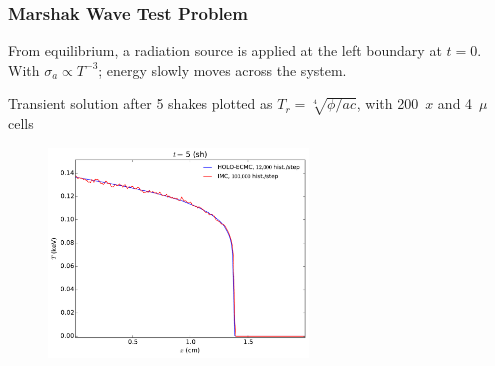 \documentclass[xcolor=dvipsnames,hyperref={pdfpagelabels=false},unknownkeysallowed]{beamer}
\newlength{\wideitemsep}
\let\olditem\item
\renewcommand{\item}{\setlength{\itemsep}{\wideitemsep}\olditem}
\begin{document}
{
\begin{frame}
    \frametitle{Marshak Wave Test Problem}
    \centering
    \begin{block}{}
        \begin{itemize}
                {\footnotesize
            \item From equilibrium, a radiation source is applied at the left
                boundary at $t=0$. With $\sigma_a\propto T^{-3}$; energy slowly moves across the
                system.
            \item Transient solution after 5 shakes plotted as $T_r =
                \sqrt[4]{\phi/ac}$, with 200~$x$ and 4~$\mu$  cells }
        \end{itemize}
    \end{block}
    \begin{figure}
    \includegraphics[width=0.615799\textwidth]{marshak_200_compare.pdf}
    \end{figure}
\end{frame}

}
\end{document}
